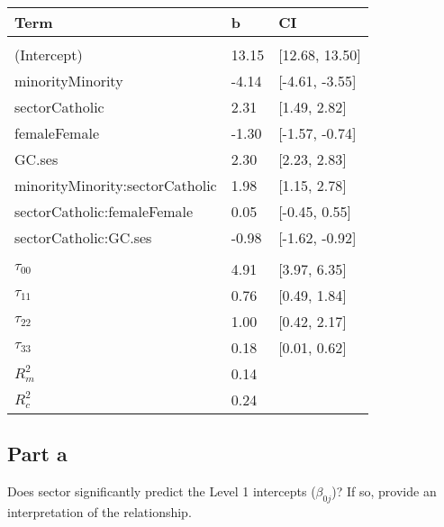 \documentclass[]{article}
\begin{document}
\begin{table}[H]
\centering
\begin{tabular}{lll}
\toprule
Term & b & CI\\
\midrule
\addlinespace[0.3em]
\multicolumn{3}{l}{\textbf{Fixed}}\\
\hspace{1em}(Intercept) & 13.15 & [12.68, 13.50]\\
\hspace{1em}minorityMinority & -4.14 & [-4.61, -3.55]\\
\hspace{1em}sectorCatholic & 2.31 & [1.49, 2.82]\\
\hspace{1em}femaleFemale & -1.30 & [-1.57, -0.74]\\
\hspace{1em}GC.ses & 2.30 & [2.23, 2.83]\\
\hspace{1em}minorityMinority:sectorCatholic & 1.98 & [1.15, 2.78]\\
\hspace{1em}sectorCatholic:femaleFemale & 0.05 & [-0.45, 0.55]\\
\hspace{1em}sectorCatholic:GC.ses & -0.98 & [-1.62, -0.92]\\
\addlinespace[0.3em]
\multicolumn{3}{l}{\textbf{Random}}\\
\hspace{1em}$\tau_{00}$ & 4.91 & [3.97, 6.35]\\
\hspace{1em}$\tau_{11}$ & 0.76 & [0.49, 1.84]\\
\hspace{1em}$\tau_{22}$ & 1.00 & [0.42, 2.17]\\
\hspace{1em}$\tau_{33}$ & 0.18 & [0.01, 0.62]\\
$R^2_m$ & 0.14 & \\
$R^2_c$ & 0.24 & \\
\bottomrule
\end{tabular}
\end{table}

\subsection{Part a}\label{part-a-2}

Does sector significantly predict the Level 1 intercepts
(\(\beta_{0j}\))? If so, provide an interpretation of the relationship.
\end{document}
